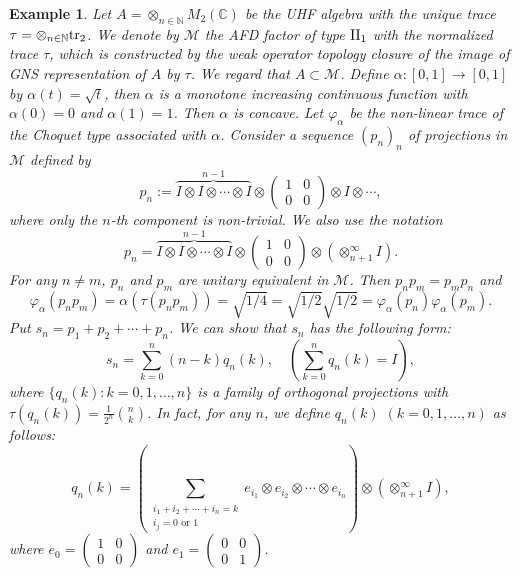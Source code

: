 \documentclass[a4paper,12pt]{amsart}
\newtheorem{example}[definition]{Example}
\newcommand{\M}{\mathcal{M}}
\newcommand{\C}{\mathbb{C}}
\newcommand{\N}{\mathbb{N}}
\begin{document}
\begin{example} \rm \label{example:UHF}
Let $A = \otimes_{n \in \N}M_2(\C)$ be the UHF algebra with the unique trace 
$\tau=\otimes_{n\in \N} {\rm tr}_2$.  We denote by $\M$ the AFD factor of type ${\rm II}_1$ 
with the normalized trace $\tau$, which is constructed by the weak operator topology closure of 
the image of GNS representation of $A$ by $\tau$. 
We regard that $A \subset \M$.  
Define $\alpha: [0,1]  \rightarrow [0, 1]$ by $\alpha (t) = {\sqrt t}$, then $\alpha$ is a 
monotone increasing continuous function with $\alpha(0) = 0$ and $\alpha(1) = 1 $. 
Then $\alpha$ is concave.  
Let $\varphi_{\alpha}$ be the non-linear trace of the Choquet type associated with $\alpha$.  
Consider a sequence $(p_n)_n$ of projections in $\M$ defined by 
\[    p_n := \overbrace{I \otimes I \otimes \cdots \otimes I}^{n-1}  \otimes 
    \begin{pmatrix}   1 & 0 \\ 0 & 0  \end{pmatrix}
    \otimes I \otimes \cdots,
\]
where only the $n$-th component is non-trivial. 
We also use the notation
\[   p_n =  \overbrace{I \otimes I \otimes \cdots \otimes I}^{n-1}  \otimes 
    \begin{pmatrix}   1 & 0 \\ 0 & 0  \end{pmatrix}\otimes (\otimes_{n+1}^\infty I).  \]
For any $n \neq m$,  $p_n$ and $p_m$ are unitary equivalent in $\M$. Then $p_np_m = p_mp_n$ and 
$$
\varphi_{\alpha}(p_np_m) = {\alpha}(\tau(p_np_m)) = \sqrt {1/4} 
= {\sqrt {1/2}}{\sqrt {1/2}} = \varphi_{\alpha}(p_n)\varphi_{\alpha}(p_m). 
$$ 
Put $s_n = p_1 + p_2 + \cdots +p_n$. 
We can show that $s_n$ has the following form:
\[  s_n = \sum_{k=0}^n  (n-k)q_n(k),  \quad  (\sum_{k=0}^n q_n(k) = I), \]
where $\{q_n(k) : k=0,1,\ldots,n \}$ is a family of orthogonal projections with
$\tau(q_n(k)) =\displaystyle \frac{1}{2^n}\binom{n}{k}$.
In fact, for any $n$, we define $q_n(k)$ $(k=0,1,\ldots, n)$ as follows:
\[   q_n(k) = (\sum_{\substack{i_1+i_2+\cdots+i_n=k \\ i_j= 0 \text{ or } 1} }  e_{i_1}\otimes e_{i_2}\otimes \cdots \otimes e_{i_n} )
   \otimes (\otimes_{n+1}^\infty I), \]
where $e_0 = \begin{pmatrix}   1 & 0 \\ 0 & 0  \end{pmatrix}$ and $e_1 = \begin{pmatrix}   0 & 0 \\ 0 & 1  \end{pmatrix}$.

\end{example}
\end{document}
